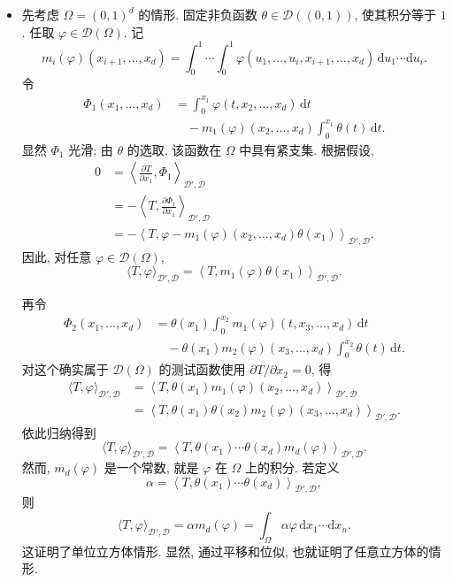 \begin{Proof}
\begin{itemize}
\item 先考虑 $\Omega=(0,1)^d$ 的情形. 固定非负函数 $\theta\in\mathcal{D}((0,1))$, 使其积分等于 $1$. 任取 $\varphi\in\mathcal{D}(\Omega)$. 记
\[
  m_i(\varphi)(x_{i+1},\ldots,x_d)
  =\int_0^1\cdots\int_0^1
  \varphi(u_1,\ldots,u_i,x_{i+1},\ldots,x_d)
  \,\mathrm{d}u_1\cdots\mathrm{d}u_i.
\]
令
\begin{align*}
\Phi_1(x_1,\ldots,x_d)
&=\int_0^{x_1}\varphi(t,x_2,\ldots,x_d)\,\mathrm{d}t\\
&\quad-m_1(\varphi)(x_2,\ldots,x_d)
\int_0^{x_1}\theta(t)\,\mathrm{d}t.
\end{align*}
显然 $\Phi_1$ 光滑; 由 $\theta$ 的选取, 该函数在 $\Omega$ 中具有紧支集. 根据假设,
\begin{align*}
0
&=\left\langle\frac{\partial T}{\partial x_1},\Phi_1\right\rangle_{\mathcal{D}',\mathcal{D}}\\
&=-\left\langle T,\frac{\partial\Phi_1}{\partial x_1}\right\rangle_{\mathcal{D}',\mathcal{D}}\\
&=-\left\langle T,
\varphi-m_1(\varphi)(x_2,\ldots,x_d)\theta(x_1)
\right\rangle_{\mathcal{D}',\mathcal{D}}.
\end{align*}
因此, 对任意 $\varphi\in\mathcal{D}(\Omega)$,
\[
  \langle T,\varphi\rangle_{\mathcal{D}',\mathcal{D}}
  =\left\langle T,m_1(\varphi)\theta(x_1)\right\rangle_{\mathcal{D}',\mathcal{D}}.
\]

再令
\begin{align*}
\Phi_2(x_1,\ldots,x_d)
&=\theta(x_1)\int_0^{x_2}m_1(\varphi)(t,x_3,\ldots,x_d)\,\mathrm{d}t\\
&\quad-\theta(x_1)m_2(\varphi)(x_3,\ldots,x_d)
\int_0^{x_2}\theta(t)\,\mathrm{d}t.
\end{align*}
对这个确实属于 $\mathcal{D}(\Omega)$ 的测试函数使用 $\partial T/\partial x_2=0$, 得
\begin{align*}
\langle T,\varphi\rangle_{\mathcal{D}',\mathcal{D}}
&=\left\langle T,\theta(x_1)m_1(\varphi)(x_2,\ldots,x_d)\right\rangle_{\mathcal{D}',\mathcal{D}}\\
&=\left\langle T,\theta(x_1)\theta(x_2)m_2(\varphi)(x_3,\ldots,x_d)\right\rangle_{\mathcal{D}',\mathcal{D}}.
\end{align*}
依此归纳得到
\[
  \langle T,\varphi\rangle_{\mathcal{D}',\mathcal{D}}
  =\left\langle T,\theta(x_1)\cdots\theta(x_d)m_d(\varphi)\right\rangle_{\mathcal{D}',\mathcal{D}}.
\]
然而, $m_d(\varphi)$ 是一个常数, 就是 $\varphi$ 在 $\Omega$ 上的积分. 若定义
\[
  \alpha=\left\langle T,\theta(x_1)\cdots\theta(x_d)\right\rangle_{\mathcal{D}',\mathcal{D}},
\]
则
\[
  \langle T,\varphi\rangle_{\mathcal{D}',\mathcal{D}}
  =\alpha m_d(\varphi)
  =\int_\Omega\alpha\varphi\,\mathrm{d}x_1\cdots\mathrm{d}x_n.
\]
这证明了单位立方体情形. 显然, 通过平移和位似, 也就证明了任意立方体的情形.


\end{itemize}
\end{Proof}
